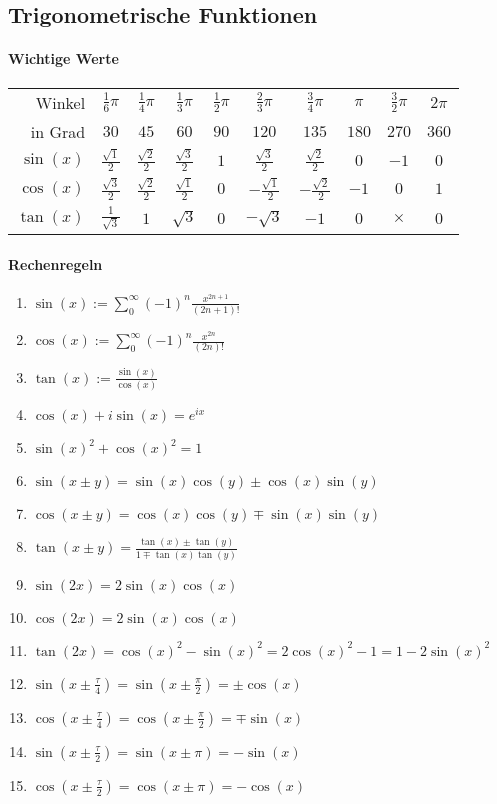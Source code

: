 \documentclass[a4paper, 9pt, DIV=24]{scrartcl}
\begin{document}
\subsection{Trigonometrische Funktionen}
\paragraph{Wichtige Werte}
\begin{center}
\begin{tabular}[m]{r|ccccccccc}
Winkel & $\frac{1}{6}\pi$ & $\frac{1}{4}\pi$ & $\frac{1}{3}\pi$ & $\frac{1}{2}\pi$ & $\frac{2}{3}\pi$ & $\frac{3}{4}\pi$ & $\pi$ & $\frac{3}{2}\pi$ & $2\pi$ \\[.1em]
in Grad & $30$ & $45$ & $60$ & $90$ & $120$ & $135$ & $180$ & $270$ & $360$ \\\hline
$\sin(x)$ & $\frac{\sqrt{1}}{2}$ & $\frac{\sqrt{2}}{2}$ & $\frac{\sqrt{3}}{2}$ & $1$ & $\frac{\sqrt{3}}{2}$ & $\frac{\sqrt{2}}{2}$ & $0$ & $-1$ & $0$ \\[.1em]
$\cos(x)$ & $\frac{\sqrt{3}}{2}$ & $\frac{\sqrt{2}}{2}$ & $\frac{\sqrt{1}}{2}$ & $0$ & $-\frac{\sqrt{1}}{2}$ & $-\frac{\sqrt{2}}{2}$ & $-1$ & $0$ & $1$ \\[.1em]
$\tan(x)$ & $\frac{1}{\sqrt{3}}$ & $1$ & $\sqrt{3}$ & $0$ & $-\sqrt{3}$ & $-1$ & $0$ & $\times$ & $0$ \\
\end{tabular}
\end{center}

\paragraph{Rechenregeln}
\begin{enumerate}[label={(}\arabic*{)}]
 \item $\sin(x) := \sum_0^\infty (-1)^n\frac{x^{2n+1}}{(2n+1)!}$
 \item $\cos(x) := \sum_0^\infty (-1)^n\frac{x^{2n}}{(2n)!}$
 \item $\tan(x) := \frac{\sin(x)}{\cos(x)}$
 \item $\cos(x) + i\sin(x) = e^{ix}$
 \item $\sin(x)^2 + \cos(x)^2 = 1$
 \item $\sin(x \pm y) = \sin(x)\cos(y) \pm \cos(x)\sin(y)$
 \item $\cos(x \pm y) = \cos(x)\cos(y) \mp \sin(x)\sin(y)$
 \item $\tan(x \pm y) = \frac{\tan(x)\pm\tan(y)}{1\mp\tan(x)\tan(y)}$
 \item $\sin(2x) = 2\sin(x)\cos(x)$
 \item $\cos(2x) = 2\sin(x)\cos(x)$
 \item $\tan(2x) = \cos(x)^2 - \sin(x)^2 = 2\cos(x)^2 - 1 = 1 - 2\sin(x)^2$
 \item $\sin(x \pm \frac{\tau}{4}) = \sin(x\pm\frac{\pi}{2}) = \pm\cos(x)$
 \item $\cos(x \pm \frac{\tau}{4}) = \cos(x\pm\frac{\pi}{2}) = \mp\sin(x)$
 \item $\sin(x \pm \frac{\tau}{2}) = \sin(x\pm\pi) = -\sin(x)$
 \item $\cos(x \pm \frac{\tau}{2}) = \cos(x\pm\pi) = -\cos(x)$
\end{enumerate}
\end{document}
